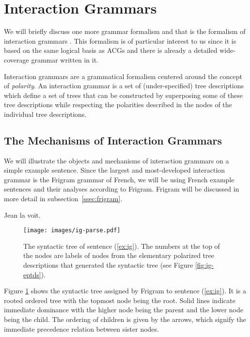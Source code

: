 \section{Interaction Grammars}

We will briefly discuss one more grammar formalism and that is the
formalism of interaction grammars \cite{guillaume2009interaction}. This
formalism is of particular interest to us since it is based on the same
logical basis as ACGs and there is already a detailed wide-coverage
grammar written in it.

Interaction grammars are a grammatical formalism centered around the
concept of \emph{polarity}. An interaction grammar is a set of
(under-specified) tree descriptions which define a set of trees that can
be constructed by superposing some of these tree descriptions while
respecting the polarities described in the nodes of the individual tree
descriptions.

\subsection{The Mechanisms of Interaction Grammars}

We will illustrate the objects and mechanisms of interaction grammars on
a simple example sentence. Since the largest and most-developed
interaction grammar is the Frigram grammar of French, we will be using
French example sentences and their analyses according to
Frigram. Frigram will be discussed in more detail in
subsection~\ref{ssec:frigram}.

\begin{exe}
  \ex \label{ex:ig} Jean la voit.
\end{exe}

\begin{figure}
  \centering
  \texttt{[image: images/ig-parse.pdf]}
  \caption{\label{fig:ig-parse} The syntactic tree of sentence
    (\ref{ex:ig}). The numbers at the top of the nodes are labels of
    nodes from the elementary polarized tree descriptions that generated
    the syntactic tree (see Figure \ref{fig:ig-eptds}).}
\end{figure}

Figure \ref{fig:ig-parse} shows the syntactic tree assigned by Frigram
to sentence (\ref{ex:ig}). It is a rooted ordered tree with the topmost
node being the root. Solid lines indicate immediate dominance with the
higher node being the parent and the lower node being the child. The
ordering of children is given by the arrows, which signify the immediate
precedence relation between sister nodes.

